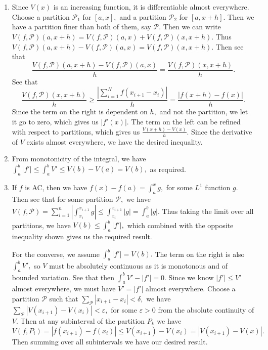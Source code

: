 \documentclass{article}
\begin{document}
\section{} %
\begin{enumerate}
	\item Since $V(x)$ is an increasing function, it is differentiable almost everywhere. Choose a partition $\mathcal{P}_1$ for $[a,x],$ and a partition 
	$\mathcal{P}_2$ for $[a,x+h].$ Then we have a partition finer than both of them, say $\mathcal{P}.$ Then we can write $V(f, \mathcal{P})(a,x+h)= V(f, 
	\mathcal{P})(a,x)+V(f, \mathcal{P})(x,x+h).$ Thus $V(f, \mathcal{P})(a,x+h)-V(f, \mathcal{P})(a,x)= V(f, \mathcal{P})(x,x+h).$ Then see that $$ 
	\frac{V(f, \mathcal{P})(a,x+h)-V(f, \mathcal{P})(a,x)}{h} = \frac{V(f, \mathcal{P})(x,x+h)}{h}.$$ See that $$\frac{V(f, \mathcal{P})(x,x+h)}{h} \geq 
	\frac{|\sum_{i=1}^{N}f(x_{i+1}-x_i)|}{h}= \frac{|f(x+h)-f(x)|}{h}.$$ Since the term on the right is dependent on $h,$ and not the partition, we let it 
	go to zero, which gives us $|f'(x)|.$ The term on the left can be refined with respect to partitions, which gives us $\frac{V(x+h)-V(x)}{h}.$ Since the 
	derivative of $V$ exists almost everywhere, we have the desired inequality.
	
	\item  From monotonicity of the integral, we have $\int_{a}^{b}|f'|\leq \int_{a}^b V' \leq V(b)-V(a)=V(b),$ as required. 
	
	\item If $f$ is AC, then we have $f(x)-f(a)=\int_{a}^x g, $ for some $L^1$ function $g.$ Then see that for some partition $\mathcal{P},$ we have 
	$V(f,\mathcal{P})= \sum_{i=1}^n \left|\int_{x_i}^{x_{i+1}}g\right| \leq \int_{x_i}^{x_{i+1}}\left|g\right| = \int_{a}^b |g|.$
	Thus taking the limit over all partitions, we have $V(b) \leq \int_{a}^{b}|f'|,$ which combined with the opposite inequality shown gives us the required 
	result.
	
	For the converse, we assume $\int_{a}^{b}|f'| = V(b).$ The term on the right is also $\int_{a}^{b}V',$ so $V$ must be absolutely continuous as it is 
	monotonous and of bounded variation. See that then $ \int_{a}^b V' - |f'| =0.$ Since we know $|f'| \leq V'$ almost everywhere, we must have $V'=|f'|$ 
	almost everywhere. Choose a partition $\mathcal{P}$ such that $ \sum_{\mathcal{P}} |x_{i+1}-x_i|< \delta,$ we have $\sum_{\mathcal{P}} 
	|V(x_{i+1})-V(x_i)|< \varepsilon,$ for some $\varepsilon >0$ from the absolute continuity of $V.$ Then at any subinterval of the partition $P_k$ we have 
	$V(f,P_i) =|f(x_{i+1})-f(x_{i})| \leq V(x_{i+1})-V(x_i)= |V(x_{i+1})-V(x)|.$ Then summing over all subintervals we have our desired result. 
\end{enumerate}
\end{document}
